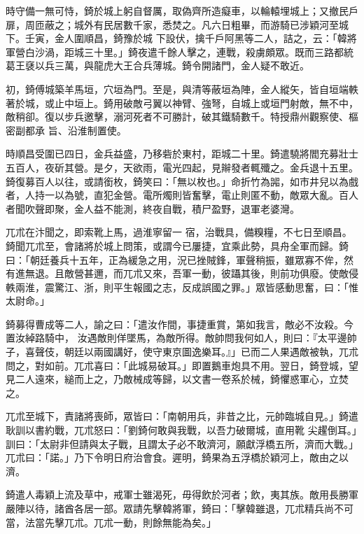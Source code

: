 \begin{pinyinscope}
 時守備一無可恃，錡於城上躬自督厲，取偽齊所造癡車，以輪轅埋城上；又撤民戶扉，周匝蔽之；城外有民居數千家，悉焚之。凡六日粗畢，而游騎已涉穎河至城下。壬寅，金人圍順昌，錡豫於城
 下設伏，擒千戶阿黑等二人，詰之，云：「韓將軍營白沙渦，距城三十里。」錡夜遣千餘人擊之，連戰，殺虜頗眾。既而三路都統葛王褎以兵三萬，與龍虎大王合兵薄城。錡令開諸門，金人疑不敢近。



 初，錡傅城築羊馬垣，穴垣為門。至是，與清等蔽垣為陣，金人縱矢，皆自垣端軼著於城，或止中垣上。錡用破敵弓翼以神臂、強弩，自城上或垣門射敵，無不中，敵稍卻。復以步兵邀擊，溺河死者不可勝計，破其鐵騎數千。特授鼎州觀察使、樞密副都承
 旨、沿淮制置使。



 時順昌受圍已四日，金兵益盛，乃移砦於東村，距城二十里。錡遣驍將閻充募壯士五百人，夜斫其營。是夕，天欲雨，電光四起，見辮發者輒殲之。金兵退十五里。錡復募百人以往，或請銜枚，錡笑曰：「無以枚也。」命折竹為嘂，如市井兒以為戲者，人持一以為號，直犯金營。電所燭則皆奮擊，電止則匿不動，敵眾大亂。百人者聞吹聲即聚，金人益不能測，終夜自戰，積尸盈野，退軍老婆灣。



 兀朮在汴聞之，即索靴上馬，過淮寧留一
 宿，治戰具，備糗糧，不七日至順昌。錡聞兀朮至，會諸將於城上問策，或謂今已屢捷，宜乘此勢，具舟全軍而歸。錡曰：「朝廷養兵十五年，正為緩急之用，況已挫賊鋒，軍聲稍振，雖眾寡不侔，然有進無退。且敵營甚邇，而兀朮又來，吾軍一動，彼躡其後，則前功俱廢。使敵侵軼兩淮，震驚江、浙，則平生報國之志，反成誤國之罪。」眾皆感動思奮，曰：「惟太尉命。」



 錡募得曹成等二人，諭之曰：「遣汝作間，事捷重賞，第如我言，敵必不汝殺。今置汝綽路騎中，
 汝遇敵則佯墜馬，為敵所得。敵帥問我何如人，則曰：『太平邊帥子，喜聲伎，朝廷以兩國講好，使守東京圖逸樂耳。』」已而二人果遇敵被執，兀朮問之，對如前。兀朮喜曰：「此城易破耳。」即置鵝車炮具不用。翌日，錡登城，望見二人遠來，縋而上之，乃敵械成等歸，以文書一卷系於械，錡懼惑軍心，立焚之。



 兀朮至城下，責諸將喪師，眾皆曰：「南朝用兵，非昔之比，元帥臨城自見。」錡遣耿訓以書約戰，兀朮怒曰：「劉錡何敢與我戰，以吾力破爾城，直用靴
 尖趯倒耳。」訓曰：「太尉非但請與太子戰，且謂太子必不敢濟河，願獻浮橋五所，濟而大戰。」兀朮曰：「諾。」乃下令明日府治會食。遲明，錡果為五浮橋於穎河上，敵由之以濟。



 錡遣人毒穎上流及草中，戒軍士雖渴死，毋得飲於河者；飲，夷其族。敵用長勝軍嚴陣以待，諸酋各居一部。眾請先擊韓將軍，錡曰：「擊韓雖退，兀朮精兵尚不可當，法當先擊兀朮。兀朮一動，則餘無能為矣。」




\end{pinyinscope}
